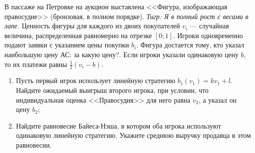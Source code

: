 \begin{problem}
В пассаже на Петровке на аукцион выставлена <<Фигура, изображающая правосудие>> (бронзовая, в полном порядке). {\it Тигр: Я в полный рост с весами в лапе.} Ценность фигуры для каждого из двоих покупателей  $v_{i} $  --- случайная величина, распределенная равномерно на отрезке  $\left[0;1\right]$. Игроки одновременно подают заявки с указанием цены покупки  $b_{i} $. Фигура достается тому, кто указал наибольшую цену {\red АС: за какую цену?}. Если игроки указали одинаковую цену  $b$, то их платежи равны  $\frac{1}{2} \left(v_{i} -b\right)$.\par
\begin{enumerate}
\item Пусть первый игрок использует линейную стратегию  $b_{1} \left(v_{1} \right)=kv_{1} +l$. Найдите ожидаемый выигрыш второго игрока, при условии, что индивидуальная оценка <<Правосудия>> для него равна  $v_{2} $, а указал он цену  $b_{2}$;\par
\item 	Найдите равновесие Байеса-Нэша, в котором оба игрока используют одинаковую линейную стратегию. Укажите среднюю выручку продавца в этом равновесии.\par
\end{enumerate}


\begin{sol}

\end{sol}
\end{problem}

